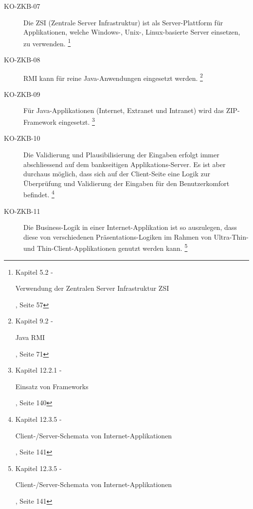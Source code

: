 \documentclass[
11pt, %
a4paper, %
BCOR25mm, %
DIV14, %
footsepline = false, %
headsepline, %
twoside, %
openright,
abstracton, %
listof=totocnumbered, %
bibliography=totocnumbered %
]{scrreprt}
\begin{document}
\begin{description}
    \item[KO-ZKB-07] Die ZSI (Zentrale Server Infrastruktur) ist als
    Server-Plattform für Applikationen, welche Windows-, Unix-, Linux-basierte
    Server einsetzen, zu verwenden.
    \footnote{\cite{ZkbHandbuchDerItArchitektur} Kapitel 5.2 -
    \begin{itshape}Verwendung der Zentralen Server Infrastruktur
    ZSI\end{itshape}, Seite 57}
    
    \item[KO-ZKB-08] RMI kann für reine Java-Anwendungen eingesetzt werden.
    \footnote{\cite{ZkbHandbuchDerItArchitektur} Kapitel 9.2 -
    \begin{itshape}Java RMI\end{itshape}, Seite 71}
    
    \item[KO-ZKB-09] Für Java-Applikationen (Internet, Extranet und Intranet)
    wird das ZIP-Framework eingesetzt.
    \footnote{\cite{ZkbHandbuchDerItArchitektur} Kapitel 12.2.1 -
    \begin{itshape}Einsatz von Frameworks\end{itshape}, Seite 140}
    
    \item[KO-ZKB-10] Die Validierung und Plausibilisierung der Eingaben erfolgt
    immer abschliessend auf dem bankseitigen Applikations-Server. Es ist aber
    durchaus möglich, dass sich auf der Client-Seite eine Logik zur
    Überprüfung und Validierung der Eingaben für den Benutzerkomfort
    befindet.
    \footnote{\cite{ZkbHandbuchDerItArchitektur} Kapitel 12.3.5 -
    \begin{itshape}Client-/Server-Schemata von Internet-Applikationen\end{itshape}, Seite 141}
    
    \item[KO-ZKB-11] Die Business-Logik in einer Internet-Applikation ist so
    auszulegen, dass diese von verschiedenen Präsentations-Logiken im Rahmen
    von Ultra-Thin- und Thin-Client-Applikationen genutzt werden kann.
    \footnote{\cite{ZkbHandbuchDerItArchitektur} Kapitel 12.3.5 -
    \begin{itshape}Client-/Server-Schemata von Internet-Applikationen\end{itshape}, Seite 141}
    

\end{description}
\end{document}
